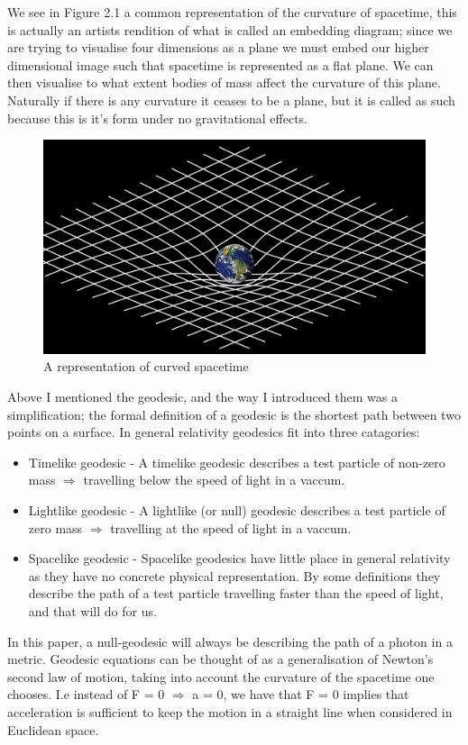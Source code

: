 \documentclass[oneside,openright,frontopenright, singlespacing]{dmathesis}
\begin{document}
\vspace{1em}
		We see in Figure 2.1 a common representation of the curvature of spacetime, this is actually an artists rendition of what is called an embedding diagram; since we are trying to visualise four dimensions as a plane we must embed our higher dimensional image such that spacetime is represented as a flat plane. We can then visualise to what extent bodies of mass affect the curvature of this plane. Naturally if there is any curvature it ceases to be a plane, but it is called as such because this is it's form under no gravitational effects.

\begin{figure}[!ht]
	\centering
	\includegraphics[width=0.5\linewidth]{img/curved-spacetime}
	\caption{A representation of curved spacetime}
\end{figure}

\vspace{1em}
	Above I mentioned the geodesic, and the way I introduced them was a simplification; the formal definition of a geodesic is the shortest path between two points on a surface. In general relativity geodesics fit into three catagories:

\vspace{1em}
\begin{itemize}
  \item Timelike geodesic - A timelike geodesic describes a test particle of non-zero mass $\Rightarrow$ travelling below the speed of light in a vaccum.
  \item Lightlike geodesic - A lightlike (or null) geodesic describes a test particle of zero mass $\Rightarrow$ travelling at the speed of light in a vaccum.
  \item Spacelike geodesic - Spacelike geodesics have little place in general relativity as they have no concrete physical representation. By some definitions they describe the path of a test particle travelling faster than the speed of light, and that will do for us.
\end{itemize}

\vspace{1em}
	 In this paper, a null-geodesic will always be describing the path of a photon in a metric. Geodesic equations can be thought of as a generalisation of Newton's second law of motion, taking into account the curvature of the spacetime one chooses. I.e instead of F = 0 $\Rightarrow$ a = 0, we have that F = 0 implies that acceleration is sufficient to keep the motion in a straight line when considered in Euclidean space.
\end{document}
